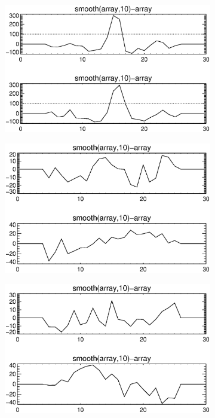 \documentclass[10pt]{scrartcl}
\begin{document}
\begin{figure}[!ht]
    \begin{subfigure}[b]{.3\linewidth}
        \centering
        \includegraphics[width=1.0\linewidth]{../plots_tables_images/1d1dsums_2_5.eps}
    \end{subfigure}
    \begin{subfigure}[b]{.3\linewidth}
        \centering
        \includegraphics[width=1.0\linewidth]{../plots_tables_images/1d1dsums_2_9.eps}
    \end{subfigure}
    \begin{subfigure}[b]{.3\linewidth}
        \centering
        \includegraphics[width=1.0\linewidth]{../plots_tables_images/1d1dsums_3_0.eps}
    \end{subfigure}
\vspace{0.2in}


\end{figure}
\end{document}
